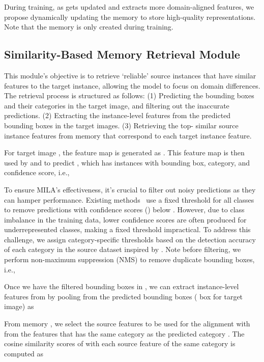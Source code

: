\documentclass{bmvc2k}
\begin{document}
During training, as  gets updated and  extracts more domain-aligned features, we propose dynamically updating the memory to store high-quality representations. Note that the memory  is only created during training.



\subsection{Similarity-Based Memory Retrieval Module} \label{sec:retrieval module}
This module's objective is to retrieve `reliable' source instances that have similar features to the target instance, allowing the model to focus on domain differences.
The retrieval process is structured as follows: (1) Predicting the bounding boxes and their categories in the target image, and filtering out the inaccurate predictions. (2) Extracting the instance-level features from the predicted bounding boxes in the target images. (3) Retrieving the top- similar source instance features from memory  that correspond to each target instance feature.








For  target image , the feature map is generated as . This feature map is then used by  and  to predict , which has  instances with bounding box, category, and confidence score, i.e., 


To ensure MILA's effectiveness, it's crucial to filter out noisy predictions as they can hamper performance. Existing methods~\cite{li2022cross} use a fixed threshold  for all classes to remove predictions with confidence scores () below . However, due to class imbalance in the training data, lower confidence scores are often produced for underrepresented classes, making a fixed threshold impractical. To address this challenge, we assign category-specific thresholds  based on the detection accuracy of each category in the source dataset inspired by \cite{sinha2020class}.
Note before filtering, we perform non-maximum suppression (NMS)  to remove duplicate bounding boxes, i.e.,


Once we have the filtered bounding boxes in , we can extract instance-level features from  by pooling from the predicted bounding boxes  ( box for  target image) as



From memory , we select the source features to be used for the alignment with  from the features that has the same category as the predicted category .
The cosine similarity scores of  with each source feature of the same category is computed as
\end{document}
